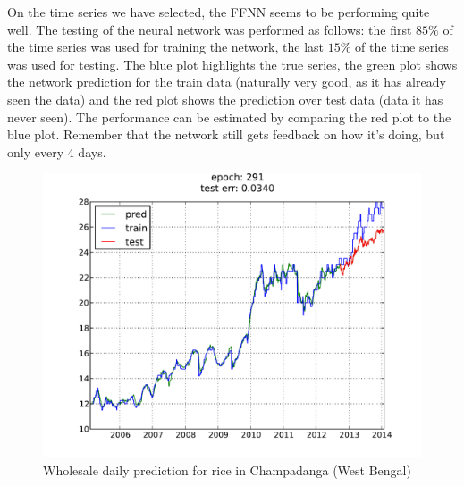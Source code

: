 On the time series we have selected, the FFNN seems to be performing quite
well. The testing of the neural network was performed as follows: the first
$85\%$ of the time series was used for training the network, the last $15\%$ of
the time series was used for testing. The blue plot highlights the true series,
the green plot shows the network prediction for the train data (naturally very
good, as it has already seen the data) and the red plot shows the prediction
over test data (data it has never seen). The performance can be estimated by
comparing the red plot to the blue plot. Remember that the network still gets
feedback on how it's doing, but only every 4 days.

\begin{figure}[H]
    \centering
    \includegraphics[width=.5\textwidth]{img/ffnn/7.pdf}
    \caption{Wholesale daily prediction for rice in Champadanga (West Bengal)}
    \label{subfig:ffnn_pred_7}
\end{figure}


